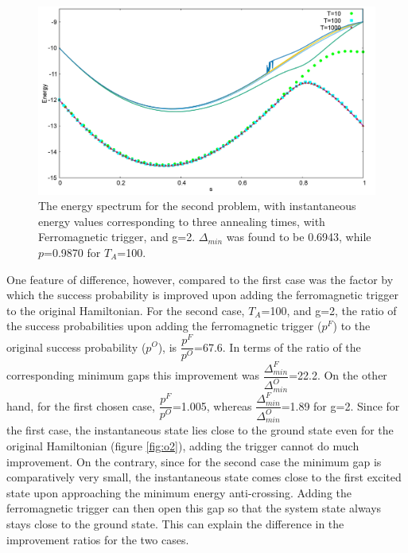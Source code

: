 \documentclass[12]{article}
\begin{document}
\begin{figure}[H]
\centering 
\includegraphics[scale=0.3]{950_s12_F_g2.png}
\caption{The energy spectrum for the second problem, with instantaneous energy values corresponding to three annealing times, with Ferromagnetic trigger, and g=2. $\Delta_{min}$ was found to be 0.6943, while $p$=0.9870 for $T_A$=100.}
\label{fig:f6}
\end{figure}


One feature of difference, however, compared to the first case was the factor by which the success probability is improved upon adding the ferromagnetic trigger to the original Hamiltonian. For the second case, $T_A$=100, and g=2, the ratio of the success probabilities upon adding the ferromagnetic trigger ($p^F$) to the original success probability ($p^O$), is $\dfrac{p^F}{p^O}$=67.6. In terms of the ratio of the corresponding minimum gaps this improvement was $\dfrac{\Delta_{min}^F}{\Delta_{min}^O}$=22.2. On the other hand, for the first chosen case, $\dfrac{p^F}{p^O}$=1.005, whereas $\dfrac{\Delta_{min}^F}{\Delta_{min}^O}$=1.89 for g=2. Since for the first case, the instantaneous state lies close to the ground state even for the original Hamiltonian (figure \ref{fig:o2}), adding the trigger cannot do much improvement. On the contrary, since for the second case the minimum gap is comparatively very small, the instantaneous state comes close to the first excited state upon approaching the minimum energy anti-crossing. Adding the ferromagnetic trigger can then open this gap so that the system state always stays close to the ground state. This can explain the difference in the improvement ratios for the two cases.
\end{document}
